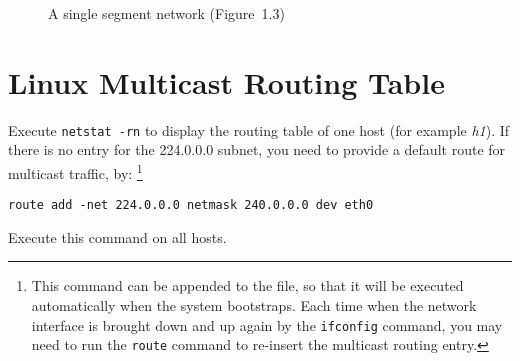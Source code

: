 \documentclass{../UTNetLab}
\begin{document}
    \begin{minipage}{0.48\textwidth}
        \begin{flushright}
            \begin{figure}[H]
                \centering
                \caption{A single segment network (Figure~1.3)}
                \label{fig:1.3}
            \end{figure}
        \end{flushright}
    \end{minipage}

\section{Linux Multicast Routing Table}
\label{sec:linux-multicast-routing}
    Execute \lstinline{netstat -rn} to display the routing table of one host (for example \textit{h1}).
    If there is no entry for the 224.0.0.0 subnet, you need to provide a default route for multicast traffic, by:
    \footnote{This command can be appended to the  file, so that it will be executed automatically when the system bootstraps. Each time when the network interface is brought down and up again by the \lstinline{ifconfig} command, you may need to run the \lstinline{route} command to re-insert the multicast routing entry.}
    \begin{lstlisting}[emph=eth0]
route add -net 224.0.0.0 netmask 240.0.0.0 dev eth0
    \end{lstlisting}
    Execute this command on all hosts.
\end{document}
